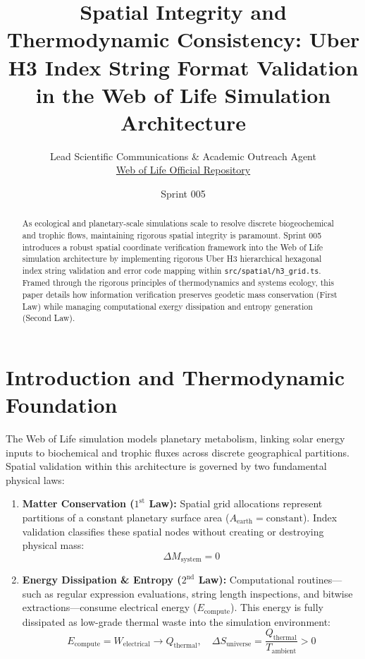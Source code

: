 \documentclass[11pt, a4paper]{article}
\title{\textbf{Spatial Integrity and Thermodynamic Consistency: Uber H3 Index String Format Validation in the Web of Life Simulation Architecture}}
\author{Lead Scientific Communications \& Academic Outreach Agent \\ \href{https://github.com/pascalranoroarijaona/WebOfLife}{Web of Life Official Repository}}
\date{Sprint 005}
\begin{document}
\maketitle

\begin{abstract}
As ecological and planetary-scale simulations scale to resolve discrete biogeochemical and trophic flows, maintaining rigorous spatial integrity is paramount. Sprint 005 introduces a robust spatial coordinate verification framework into the Web of Life simulation architecture by implementing rigorous Uber H3 hierarchical hexagonal index string validation and error code mapping within \texttt{src/spatial/h3\_grid.ts}. Framed through the rigorous principles of thermodynamics and systems ecology, this paper details how information verification preserves geodetic mass conservation (First Law) while managing computational exergy dissipation and entropy generation (Second Law).
\end{abstract}

\section{Introduction and Thermodynamic Foundation}
The Web of Life simulation models planetary metabolism, linking solar energy inputs to biochemical and trophic fluxes across discrete geographical partitions. Spatial validation within this architecture is governed by two fundamental physical laws:
\begin{enumerate}
    \item \textbf{Matter Conservation ($1^{\text{st}}$ Law):} Spatial grid allocations represent partitions of a constant planetary surface area ($A_{\text{earth}} = \text{constant}$). Index validation classifies these spatial nodes without creating or destroying physical mass:
    \begin{equation}
        \Delta M_{\text{system}} = 0
    \end{equation}
    \item \textbf{Energy Dissipation \& Entropy ($2^{\text{nd}}$ Law):} Computational routines—such as regular expression evaluations, string length inspections, and bitwise extractions—consume electrical energy ($E_{\text{compute}}$). This energy is fully dissipated as low-grade thermal waste into the simulation environment:
    \begin{equation}
        E_{\text{compute}} = W_{\text{electrical}} \rightarrow Q_{\text{thermal}}, \quad \Delta S_{\text{universe}} = \frac{Q_{\text{thermal}}}{T_{\text{ambient}}} > 0
    \end{equation}
\end{enumerate}
\end{document}

